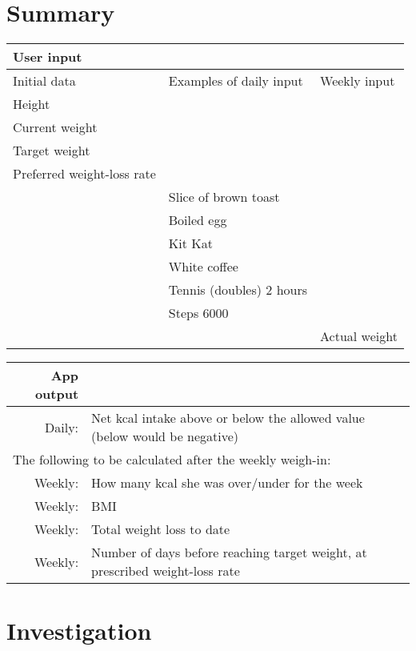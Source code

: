 \section{Summary}
\begin{table}[h]
\begin{tabular}{lll}
\textbf{User input}\\
\hline\hline
Initial data & Examples of daily input & Weekly input\\
\hline
Height\\
Current weight\\
Target weight\\
Preferred weight-loss rate\\
\hline
& Slice of brown toast\\
& Boiled egg\\
& Kit Kat\\
& White coffee\\
\hline
& Tennis (doubles) 2 hours\\
& Steps 6000\\
\hline
&& Actual weight\\
\hline\hline
\end{tabular}
\vspace{3\baselineskip}

\begin{tabular}{r@{\hspace{5pt}}l}
\textbf{App output}\\
\hline\hline
Daily:  & Net kcal intake above or below the allowed value (below would be negative)\\[6pt]
\multicolumn{2}{l}{The following to be calculated after the weekly weigh-in:}\\[6pt]
Weekly: & How many kcal she was over/under for the week\\[0pt]
Weekly: & BMI\\[0pt]
Weekly: & Total weight loss to date\\[0pt]
Weekly: & Number of days before reaching target weight, at prescribed weight-loss rate\\
\hline\hline
\end{tabular}
\end{table}


\section{Investigation}

